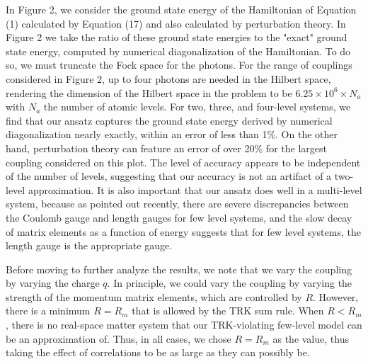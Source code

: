 \documentclass[aps,prb,twocolumn,
	groupedaddress,superscriptaddress,
	amsfonts,amssymb,amsmath,floatfix,
	citeautoscript]{revtex4-1}
\begin{document}
In Figure 2, we consider the ground state energy of the Hamiltonian of Equation (1) calculated by Equation (17) and also calculated by perturbation theory. In Figure 2 we take the ratio of these ground state energies to the "exact" ground state energy, computed by numerical diagonalization of the Hamiltonian. To do so, we must truncate the Fock space for the photons. For the range of couplings considered in Figure 2, up to four photons are needed in the Hilbert space, rendering the dimension of the Hilbert space in the problem to be $6.25\times10^6 \times N_a$ with $N_a$ the number of atomic levels. For two, three, and four-level systems, we find that our ansatz captures the ground state energy derived by numerical diagonalization nearly exactly, within an error of less than 1\%. On the other hand, perturbation theory can feature an error of over 20\% for the largest coupling considered on this plot. The level of accuracy appears to be independent of the number of levels, suggesting that our accuracy is not an artifact of a two-level approximation. It is also important that our ansatz does well in a multi-level system, because as pointed out recently, there are severe discrepancies between the Coulomb gauge and length gauges for few level systems, and the slow decay of matrix elements as a function of energy suggests that for few level systems, the length gauge is the appropriate gauge.

Before moving to further analyze the results, we note that we vary the coupling by varying the charge $q$. In principle, we could vary the coupling by varying the strength of the momentum matrix elements, which are controlled by $R$. However, there is a minimum $R=R_{m}$ that is allowed by the TRK sum rule. When $R < R_m$, there is no real-space matter system that our TRK-violating  few-level model can be an approximation of. Thus, in all cases, we chose $R=R_m$ as the value, thus taking the effect of correlations to be as large as they can possibly be.
\end{document}
